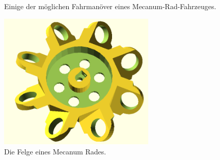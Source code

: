 \documentclass[a4paper,bibtotoc,oneside]{scrbook}
\begin{document}
\begin{figure}
\caption{Einige der möglichen Fahrmanöver eines Mecanum-Rad-Fahrzeuges.}\label{fahrman}
\end{figure} 

\begin{figure}[htbp]
\centering
\includegraphics[width=75mm]{img/wheel.png}
\caption{Die Felge eines Mecanum Rades.}\label{rad}
\end{figure}
\end{document}
